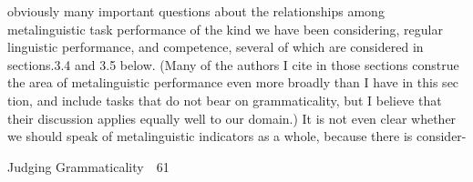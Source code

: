 \begin{styleStandard}
obviously many important questions about the relationships among metalinguistic task performance of the kind we have been considering, regular linguistic performance, and competence, several of which are considered in sections.3.4 and 3.5 below. (Many of the authors I cite in those sections construe the area of metalinguistic performance even more broadly than I have in this sec\- tion, and include tasks that do not bear on grammaticality, but I believe that their discussion applies equally well to our domain.) It is not even clear whether we should speak of metalinguistic indicators as a whole, because there is consider-
\end{styleStandard}


\clearpage\setcounter{page}{1}\begin{styleStandard}
Judging Grammaticality\ \ 61
\end{styleStandard}


